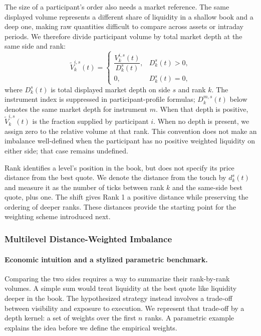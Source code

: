 \documentclass[11pt]{article}
\begin{document}
The size of a participant's order also needs a market reference. The same displayed volume represents a different share
of liquidity in a shallow book and a deep one, making raw quantities difficult to compare across assets or intraday
periods. We therefore divide participant volume by total market depth at the same side and rank:
\begin{equation}
    \widetilde V^{i,s}_{k}(t)
    =\begin{cases}
    \dfrac{V^{i,s}_{k}(t)}{D^{s}_{k}(t)},
    & D^{s}_{k}(t)>0,\\
    0,
    & D^{s}_{k}(t)=0,
    \end{cases}
    \label{eq:relative_agent_depth}
\end{equation}
where $D^{s}_{k}(t)$ is total displayed market depth on side $s$ and rank $k$. The instrument index is suppressed in participant-profile formulas; $D^{m,s}_{k}(t)$ below denotes the same market depth for instrument $m$. When that depth is positive,
$\widetilde V^{i,s}_{k}(t)$ is the fraction supplied by participant $i$. When no depth is present, we assign zero to the
relative volume at that rank. This convention does not make an imbalance well-defined when the participant has no
positive weighted liquidity on either side; that case remains undefined.

Rank identifies a level's position in the book, but does not specify its price distance from the best quote. We denote
the distance from the touch by $d^{s}_{k}(t)$ and measure it as the number of ticks between rank $k$ and the same-side best
quote, plus one. The shift gives Rank 1 a positive distance while preserving the ordering of deeper ranks. These
distances provide the starting point for the weighting scheme introduced next.

\subsubsection{Multilevel Distance-Weighted Imbalance}
\label{subsec:multilevel_dwi}

\paragraph{Economic intuition and a stylized parametric benchmark.}
Comparing the two sides requires a way to summarize their rank-by-rank volumes. A simple sum would treat liquidity at the best quote like liquidity deeper in the book. The hypothesized strategy instead involves a trade-off between visibility and exposure to execution. We represent that trade-off by a depth kernel: a set of weights over the first $n$ ranks. A parametric example explains the idea before we define the empirical weights.
\end{document}
